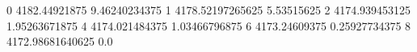 0 4182.44921875 9.46240234375
1 4178.52197265625 5.53515625
2 4174.939453125 1.95263671875
4 4174.021484375 1.03466796875
6 4173.24609375 0.25927734375
8 4172.98681640625 0.0
